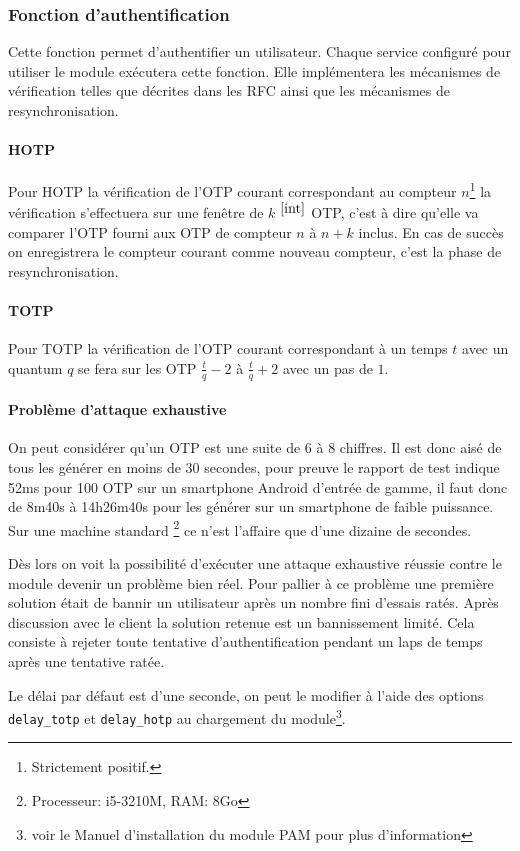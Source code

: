 \subsubsection{Fonction d'authentification}
Cette fonction permet d'authentifier un utilisateur. Chaque service configuré
pour utiliser le module exécutera cette fonction. Elle implémentera les
mécanismes de vérification telles que décrites dans les RFC ainsi que les
mécanismes de resynchronisation.
\paragraph{HOTP}
Pour HOTP la vérification de l'OTP courant correspondant au compteur
$n$\footnote{Strictement positif.\label{int}} la vérification s'effectuera sur
une fenêtre de  $k$ $^{\ref{int}}$ OTP, c'est à dire qu'elle va comparer l'OTP
fourni aux OTP de compteur $n$ à $n+k$ inclus. En cas de succès on enregistrera
le compteur courant comme nouveau compteur, c'est la phase de resynchronisation.
\paragraph{TOTP}
Pour TOTP la vérification de l'OTP courant correspondant à un temps $t$ avec un
quantum $q$ se fera sur les OTP $\frac{t}{q} - 2$ à $\frac{t}{q} + 2$ avec un
pas de $1$.

\newpage
\paragraph{Problème d'attaque exhaustive}
On peut considérer qu'un OTP est une suite de 6 à 8 chiffres. Il est donc aisé
de tous les générer en moins de 30 secondes, pour preuve le rapport de test
indique 52ms pour 100 OTP sur un smartphone Android d'entrée de gamme,
il faut donc de 8m40s à 14h26m40s pour les générer sur un smartphone de faible
puissance. Sur une machine standard \footnote{Processeur: i5-3210M, RAM: 8Go} ce
n'est l'affaire que d'une dizaine de secondes.

Dès lors on voit la possibilité d'exécuter une attaque exhaustive réussie contre
le module devenir un problème bien réel. Pour pallier à ce problème une première
solution était de bannir un utilisateur après un nombre fini d'essais ratés. Après
discussion avec le client la solution retenue est un bannissement limité. Cela
consiste à rejeter toute tentative d'authentification pendant un laps de temps
après une tentative ratée.

Le délai par défaut est d'une seconde, on peut le modifier à l'aide des options
\verb?delay_totp? et \verb?delay_hotp? au chargement du module\footnote{voir le
Manuel d'installation du module PAM pour plus d'information}.

